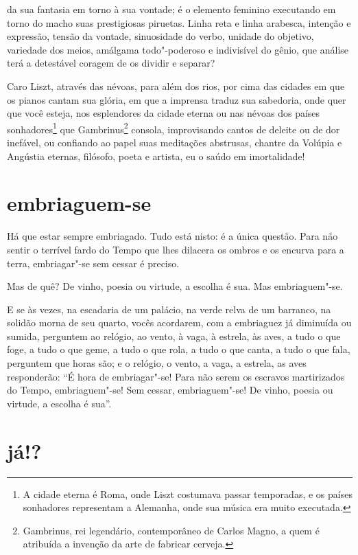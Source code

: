 \quebra

\noindent{}da sua fantasia em torno à sua vontade; é o
elemento feminino executando em torno do macho suas prestigiosas
piruetas. Linha reta e linha arabesca, intenção e expressão, tensão da
vontade, sinuosidade do verbo, unidade do objetivo, variedade dos
meios, amálgama todo"-poderoso e indivisível do gênio, que análise
terá a detestável coragem de os dividir e separar?

Caro Liszt, através das névoas, para além dos rios, por cima das cidades
em que os pianos cantam sua glória, em que a imprensa traduz sua
sabedoria, onde quer que você esteja, nos esplendores da cidade eterna
ou nas névoas dos países sonhadores\protect\footnote{  A cidade eterna é Roma, 
onde Liszt costumava passar temporadas, e os
países sonhadores representam a Alemanha, onde sua música era muito
executada.} que Gambrinus\protect\footnote{  Gambrinus, rei 
legendário, contemporâneo de Carlos Magno, a quem é
atribuída a invenção da arte de fabricar cerveja.}
consola, improvisando cantos de deleite ou
de dor inefável, ou confiando ao papel suas meditações abstrusas,
chantre da Volúpia e Angústia eternas, filósofo, poeta e artista, eu o
saúdo em imortalidade!

\quebra\section[Embriaguem-se]{embriaguem-se}

Há que estar sempre embriagado. Tudo está nisto: é a única questão. Para
não sentir o terrível fardo do Tempo que lhes dilacera os ombros e os
encurva para a terra, embriagar"-se sem cessar é preciso.

Mas de quê? De vinho, poesia ou virtude, a escolha é sua. Mas
embriaguem"-se.

E se às vezes, na escadaria de um palácio, na verde relva de um
barranco, na solidão morna de seu quarto, vocês acordarem, com a
embriaguez já diminuída ou sumida, perguntem ao relógio, ao vento, à
vaga, à estrela, às aves, a tudo o que foge, a tudo o que geme, a tudo o que
rola, a tudo o que canta, a tudo o que fala, perguntem que horas são; e
o relógio, o vento, a vaga, a estrela, as aves responderão:
“É hora de embriagar"-se! Para não serem os escravos
martirizados do Tempo, embriaguem"-se! Sem cessar, embriaguem"-se! De
vinho, poesia ou virtude, a escolha é sua''.

\quebra\section[Já!?]{já!?}

